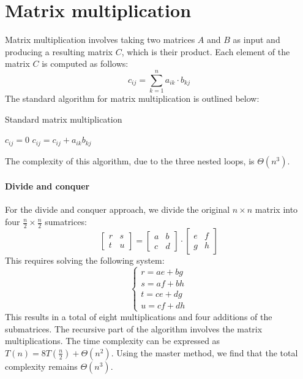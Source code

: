\section{Matrix multiplication}

Matrix multiplication involves taking two matrices $A$ and $B$ as input and producing a resulting matrix $C$, which is their product.
Each element of the matrix $C$ is computed as follows:
\[c_{ij}=\sum_{k=1}^{n}a_{ik}\cdot b_{kj}\]
The standard algorithm for matrix multiplication is outlined below:
\begin{algorithm}[H]
    \caption{Standard matrix multiplication}
        \begin{algorithmic}[1]
                    \State $c_{ij} = 0$
                        \State $c_{ij} = c_{ij}+a_{ik} b_{kj}$
                    \EndFor
                \EndFor
            \EndFor
        \end{algorithmic}
\end{algorithm}
The complexity of this algorithm, due to the three nested loops, is $\Theta(n^3)$.

\paragraph*{Divide and conquer}
For the divide and conquer approach, we divide the original $n\times n$ matrix into four $\frac{n}{2}\times\frac{n}{2}$ sumatrices: 
\[\begin{bmatrix} r & s \\ t & u \end{bmatrix}=\begin{bmatrix} a & b \\ c & d \end{bmatrix} \cdot \begin{bmatrix} e & f \\ g & h \end{bmatrix}\]
This requires solving the following system:
\[\begin{cases} r = ae + bg \\ s = af + bh \\ t = ce + dg \\ u = cf + dh \end{cases}\]
This results in a total of eight multiplications and four additions of the submatrices. 
The recursive part of the algorithm involves the matrix multiplications. 
The time complexity can be expressed as $T(n)=8T\left(\frac{n}{2}\right)+\Theta(n^2)$.
Using the master method, we find that the total complexity remains $\Theta(n^3)$.

